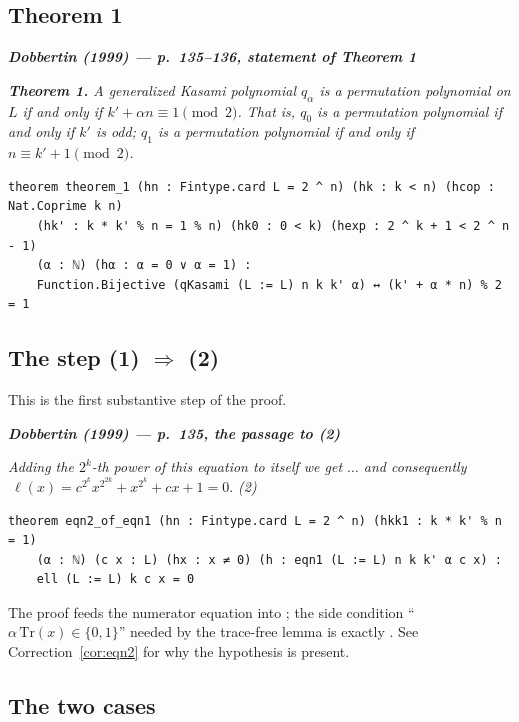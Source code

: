 \documentclass[11pt]{article}
\newenvironment{paperquote}[1]
 {\par\smallskip\noindent
  \def\FrameCommand{\color{quotebar}\vrule width 3pt\hspace{8pt}}%
  \MakeFramed{\advance\hsize-\width \FrameRestore}%
  \small\itshape
  \noindent\normalfont\footnotesize\textbf{\textsf{Dobbertin (1999) --- #1}}\par\nobreak\smallskip\itshape}
 {\endMakeFramed\par\smallskip}
\theoremstyle{definition}
\begin{document}
\subsection{Theorem 1}

\begin{paperquote}{p.~135--136, statement of Theorem 1}
\textbf{Theorem 1.} A generalized Kasami polynomial $q_\alpha$ is a permutation
polynomial on $L$ if and only if $k'+\alpha n\equiv 1\pmod 2$. That is,
$q_0$ is a permutation polynomial if and only if $k'$ is odd;
$q_1$ is a permutation polynomial if and only if $n\equiv k'+1\pmod 2$.
\end{paperquote}

\begin{lstlisting}
theorem theorem_1 (hn : Fintype.card L = 2 ^ n) (hk : k < n) (hcop : Nat.Coprime k n)
    (hk' : k * k' % n = 1 % n) (hk0 : 0 < k) (hexp : 2 ^ k + 1 < 2 ^ n - 1)
    (α : ℕ) (hα : α = 0 ∨ α = 1) :
    Function.Bijective (qKasami (L := L) n k k' α) ↔ (k' + α * n) % 2 = 1
\end{lstlisting}

\subsection{The step (1) $\Rightarrow$ (2)}

This is the first substantive step of the proof.

\begin{paperquote}{p.~135, the passage to (2)}
Adding the $2^k$-th power of this equation to itself we get $\ldots$ and
consequently $\ \ell(x)=c^{2^k}x^{2^{2k}}+x^{2^k}+cx+1=0.$ \hfill (2)
\end{paperquote}

\begin{lstlisting}
theorem eqn2_of_eqn1 (hn : Fintype.card L = 2 ^ n) (hkk1 : k * k' % n = 1)
    (α : ℕ) (c x : L) (hx : x ≠ 0) (h : eqn1 (L := L) n k k' α c x) :
    ell (L := L) k c x = 0
\end{lstlisting}

The proof feeds the numerator equation into ; the side
condition ``$\alpha\,\mathrm{Tr}(x)\in\{0,1\}$'' needed by the trace-free lemma
is exactly .  See Correction~\ref{cor:eqn2} for why the
hypothesis  is present.

\subsection{The two cases}
\end{document}
